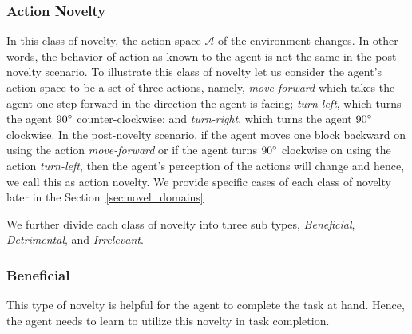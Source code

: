 \documentclass[sigconf]{aamas}
\begin{document}
\subsubsection{Action Novelty}
In this class of novelty, the action space $\mathcal{A}$ of the environment changes. In other words, the behavior of action as known to the agent is not the same in the post-novelty scenario. To illustrate this class of novelty let us consider the agent's action space to be a set of three actions, namely, \emph{move-forward} which takes the agent one step forward in the direction the agent is facing; \emph{turn-left}, which turns the agent $90\degree$ counter-clockwise; and \emph{turn-right}, which turns the agent $90\degree$ clockwise. In the post-novelty scenario, if the agent moves one block backward on using the action \emph{move-forward} or if the agent turns $90\degree$ clockwise on using the action \emph{turn-left}, then the agent's perception of the actions will change and hence, we call this as action novelty. We provide specific cases of each class of novelty later in the Section~\ref{sec:novel_domains}

We further divide each class of novelty into three sub types, \emph{Beneficial}, \emph{Detrimental}, and \emph{Irrelevant}.

\subsubsection{Beneficial}
This type of novelty is helpful for the agent to complete the task at hand. Hence, the agent needs to learn to utilize this novelty in task completion.
\end{document}
